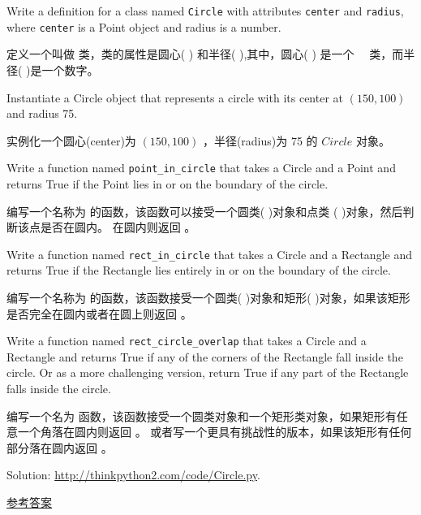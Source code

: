 \begin{exercise}

Write a definition for a class named {\tt Circle} with attributes
{\tt center} and {\tt radius}, where {\tt center} is a Point object
and radius is a number.

定义一个叫做  类，类的属性是圆心(  ) 和半径(  ),其中，圆心( ) 是一个　 类，而半径( )是一个数字。

Instantiate a Circle object that represents a circle with its center
at $(150, 100)$ and radius 75.

实例化一个圆心(center)为 $(150, 100)$ ，半径(radius)为 75 的 $Circle$ 对象。

Write a function named \verb"point_in_circle" that takes a Circle and
a Point and returns True if the Point lies in or on the boundary of
the circle.

编写一个名称为  的函数，该函数可以接受一个圆类( )对象和点类 (  )对象，然后判断该点是否在圆内。 在圆内则返回  。

Write a function named \verb"rect_in_circle" that takes a Circle and a
Rectangle and returns True if the Rectangle lies entirely in or on the boundary
of the circle.

编写一个名称为  的函数，该函数接受一个圆类( )对象和矩形( )对象，如果该矩形是否完全在圆内或者在圆上则返回  。

Write a function named \verb"rect_circle_overlap" that takes a Circle
and a Rectangle and returns True if any of the corners of the Rectangle fall
inside the circle.  Or as a more challenging version, return True if
any part of the Rectangle falls inside the circle.

编写一个名为  函数，该函数接受一个圆类对象和一个矩形类对象，如果矩形有任意一个角落在圆内则返回  。 或者写一个更具有挑战性的版本，如果该矩形有任何部分落在圆内返回  。

Solution: \url{http://thinkpython2.com/code/Circle.py}.

\href{http://thinkpython2.com/code/Circle.py}{参考答案}

\end{exercise}

